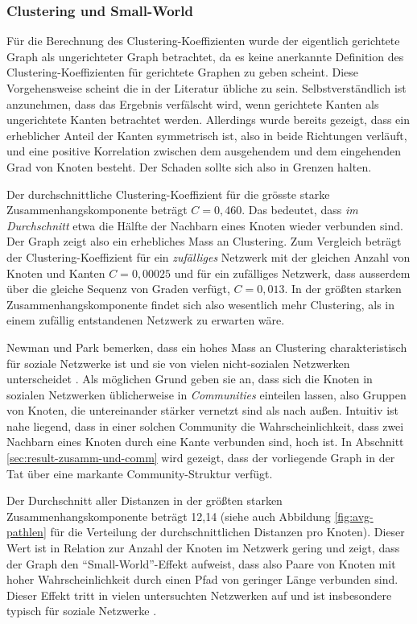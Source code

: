 \subsubsection{Clustering und Small-World}
\label{sec:clustering-und-small}

Für die Berechnung des Clustering-Koeffizienten wurde der eigentlich
gerichtete Graph als ungerichteter Graph betrachtet, da es keine
anerkannte Definition des Clustering-Koeffizienten für gerichtete
Graphen zu geben scheint. Diese Vorgehensweise scheint die in der
Literatur übliche zu sein. Selbstverständlich ist anzunehmen, dass
das Ergebnis verfälscht wird, wenn gerichtete Kanten als
ungerichtete Kanten betrachtet werden. Allerdings wurde bereits
gezeigt, dass ein erheblicher Anteil der Kanten symmetrisch ist, also
in beide Richtungen verläuft, und eine positive Korrelation zwischen
dem ausgehendem und dem eingehenden Grad von Knoten besteht. Der
Schaden sollte sich also in Grenzen halten.

Der durchschnittliche Clustering-Koeffizient für die grösste
starke Zusammenhangskomponente beträgt $C = 0,460$. Das bedeutet,
dass \emph{im Durchschnitt} etwa die Hälfte der Nachbarn eines
Knoten wieder verbunden sind. Der Graph zeigt also ein erhebliches
Mass an Clustering. Zum Vergleich beträgt der Clustering-Koeffizient
für ein \emph{zufälliges} Netzwerk mit der gleichen Anzahl von
Knoten und Kanten $C = 0,00025$ und für ein zufälliges Netzwerk,
dass ausserdem über die gleiche Sequenz von Graden verfügt, $C =
0,013$. In der größten starken Zusammenhangskomponente findet sich
also wesentlich mehr Clustering, als in einem zufällig entstandenen
Netzwerk zu erwarten wäre.

Newman und Park bemerken, dass ein hohes Mass an Clustering
charakteristisch für soziale Netzwerke ist und sie von vielen
nicht-sozialen Netzwerken unterscheidet \cite{PhysRevE.68.036122}. Als
möglichen Grund geben sie an, dass sich die Knoten in sozialen
Netzwerken üblicherweise in \emph{Communities} einteilen lassen,
also Gruppen von Knoten, die untereinander stärker vernetzt sind als
nach außen. Intuitiv ist nahe liegend, dass in einer solchen Community
die Wahrscheinlichkeit, dass zwei Nachbarn eines Knoten durch eine
Kante verbunden sind, hoch ist. In Abschnitt
\ref{sec:result-zusamm-und-comm} wird gezeigt, dass der vorliegende
Graph in der Tat über eine markante Community-Struktur verfügt.

Der Durchschnitt aller Distanzen in der größten starken
Zusammenhangskomponente beträgt 12,14 (siehe auch Abbildung
\ref{fig:avg-pathlen} für die Verteilung der durchschnittlichen
Distanzen pro Knoten). Dieser Wert ist in Relation zur Anzahl der
Knoten im Netzwerk gering und zeigt, dass der Graph den
``Small-World''-Effekt aufweist, dass also Paare von Knoten mit
hoher Wahrscheinlichkeit durch einen Pfad von geringer Länge
verbunden sind. Dieser Effekt tritt in vielen untersuchten Netzwerken
auf und ist insbesondere typisch für soziale Netzwerke
\cite{newman:167}.

